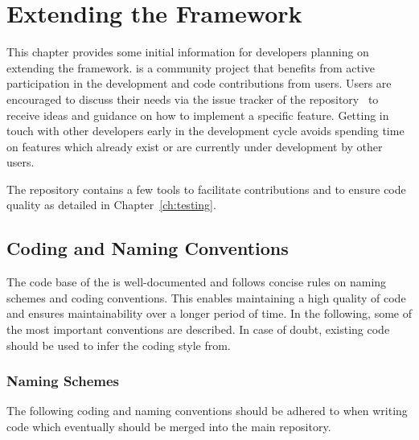 \chapter{Extending the \corry Framework}

This chapter provides some initial information for developers planning on extending the \corry framework.
\corry is a community project that benefits from active participation in the development and code contributions from users.
Users are encouraged to discuss their needs via the issue tracker of the repository~\cite{corry-issue-tracker} to receive ideas and guidance on how to implement a specific feature.
Getting in touch with other developers early in the development cycle avoids spending time on features which already exist or are currently under development by other users.

The repository contains a few tools to facilitate contributions and to ensure code quality as detailed in Chapter~\ref{ch:testing}.

\section{Coding and Naming Conventions}

The code base of the \corry is well-documented and follows concise rules on naming schemes and coding conventions.
This enables maintaining a high quality of code and ensures maintainability over a longer period of time.
In the following, some of the most important conventions are described.
In case of doubt, existing code should be used to infer the coding style from.

\subsection{Naming Schemes}

The following coding and naming conventions should be adhered to when writing code which eventually should be merged into the main repository.

